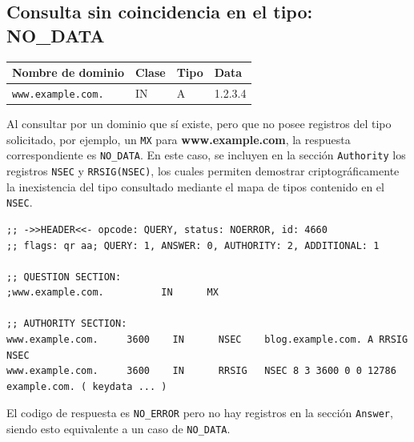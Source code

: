 \subsection{Consulta sin coincidencia en el tipo: NO\_DATA}

\begin{table}[h!]
\centering
\begin{tabular}{llll}
\textbf{Nombre de dominio} & \textbf{Clase} & \textbf{Tipo} & \textbf{Data} \\
\hline
\texttt{www.example.com.} & IN & A & 1.2.3.4 \\
\end{tabular}
\end{table}

Al consultar por un dominio que sí existe, pero que no posee registros del tipo solicitado, por ejemplo, un \texttt{MX} para \textbf{www.example.com}, la respuesta correspondiente es 
\texttt{NO\_DATA}. En este caso, se incluyen en la sección \texttt{Authority} los registros \texttt{NSEC} y \texttt{RRSIG(NSEC)}, los cuales permiten demostrar criptográficamente la 
inexistencia del tipo consultado mediante el mapa de tipos contenido en el \texttt{NSEC}.\\

\begin{lstlisting}
;; ->>HEADER<<- opcode: QUERY, status: NOERROR, id: 4660
;; flags: qr aa; QUERY: 1, ANSWER: 0, AUTHORITY: 2, ADDITIONAL: 1

;; QUESTION SECTION:
;www.example.com.          IN      MX

;; AUTHORITY SECTION:
www.example.com.     3600    IN      NSEC    blog.example.com. A RRSIG NSEC
www.example.com.     3600    IN      RRSIG   NSEC 8 3 3600 0 0 12786 example.com. ( keydata ... )
\end{lstlisting}

El codigo de respuesta es \texttt{NO\_ERROR} pero no hay registros en la sección \texttt{Answer}, siendo esto equivalente a un caso de \texttt{NO\_DATA}.
    


